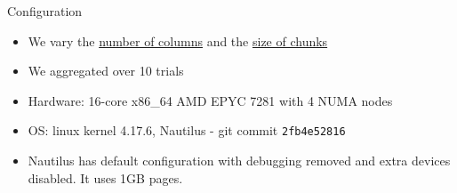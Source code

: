\begin{block}{Configuration}
  \begin{itemize}
  \item We vary the \underline{number of columns} and the \underline{size of chunks}
  \item We aggregated over 10 trials
  \item Hardware: 16-core x86\_64 AMD EPYC 7281 with 4 NUMA nodes
  \item OS: linux kernel 4.17.6, Nautilus - git commit \texttt{2fb4e52816}
  \item Nautilus has default configuration with debugging removed and extra devices disabled. It uses 1GB pages.
  \end{itemize}
\end{block}

